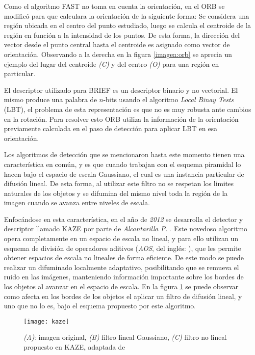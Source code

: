 Como el algoritmo FAST no toma en cuenta la orientación, en el ORB se modificó para que calculara la orientación de la siguiente forma: Se considera una región ubicada en el centro del punto estudiado, luego se calcula el centroide de la región en función a la intensidad de los puntos. De esta forma, la dirección del vector desde el punto central  hasta el centroide es asignado como vector de orientación. Observando a la derecha en la figura \ref{imagen:orb} se aprecia un ejemplo del lugar del centroide \textit{(C)} y del centro \textit{(O)} para una región en particular.

El descriptor utilizado para BRIEF es un descriptor binario y no vectorial. El mismo produce una palabra de $n$-bits usando el algoritmo \textit{Local Binay Tests} (LBT), el problema de esta representación es que no es muy robusta ante cambios en la rotación. Para resolver esto ORB utiliza la información de la orientación previamente calculada en el paso de detección para aplicar LBT en esa orientación.

Los algoritmos de detección que se mencionaron hasta este momento tienen una característica en común, y es que cuando trabajan con el esquema piramidal lo hacen bajo el espacio de escala Gaussiano, el cual es una instancia particular de difusión lineal. De esta forma, al utilizar este filtro no se respetan los limites naturales de los objetos y se difumina del mismo nivel toda la región de la imagen cuando se avanza entre niveles de escala.

Enfocándose en esta característica, en el año de \textit{2012} se desarrolla el detector y descriptor llamado KAZE \cite{kaze} por parte de \textit{Alcantarilla P. }. Este novedoso algoritmo opera completamente en un espacio de escala no lineal, y para ello utilizan un esquema de división de operadores aditivos (\textit{AOS}, del inglés: ), que les permite obtener espacios de escala no lineales de forma eficiente. De este modo se puede realizar un difuminado localmente adaptativo, posibilitando que se remueva el ruido en las imágenes, manteniendo información importante sobre los bordes de los objetos al avanzar en el espacio de escala. En la figura \ref{imagen:kaze} se puede observar como afecta en los bordes de los objetos el aplicar un filtro de difusión lineal, y uno que no lo es, bajo el esquema propuesto por este algoritmo.

\begin{figure}[H]
	\centering
	\texttt{[image: kaze]}
	\caption[Filtro no lineal propuesto por KAZE]{\textit{(A)}: imagen original, \textit{(B)} filtro lineal Gaussiano, \textit{(C)} filtro no lineal propuesto en KAZE, adaptada de \cite{kaze}}
	\label{imagen:kaze}
\end{figure}

